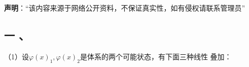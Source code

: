 
\textbf{声明}：“该内容来源于网络公开资料，不保证真实性，如有侵权请联系管理员”

\subsection{一 、}

（1）设$\varphi(x)_1, \varphi(x)_2$是体系的两个可能状态，有下面三种线性
叠加：
